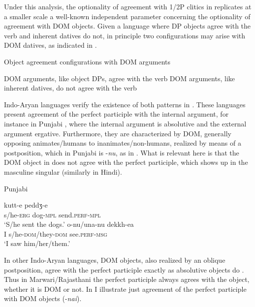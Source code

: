 \documentclass[output=paper]{langscibook}
\begin{document}
Under this analysis, the optionality of agreement with 1/2P clitics in  replicates at a smaller scale a well-known independent parameter concerning the optionality of agreement with DOM objects. Given a language where DP objects agree with the verb and inherent datives do not, in principle two configurations may arise with DOM datives, as indicated in .

\ea\label{ex:manzini:}
Object agreement configurations with DOM arguments \\
\begin{xlist}
\ex DOM arguments, like object DPs, agree with the verb
\ex DOM arguments, like inherent datives, do not agree with the verb
\end{xlist}
\z

Indo-Aryan languages verify the existence of both patterns in \emph{.} These languages present agreement of the perfect participle with the internal argument, for instance in Punjabi , where the internal argument is absolutive and the external argument ergative. Furthermore, they are characterized by DOM, generally opposing animates/humans to inanimates/non-humans, realized by means of a postposition, which in Punjabi is -\textit{nu}, as in . What is relevant here is that the DOM object in  does not agree with the perfect participle, which shows up in the masculine singular (similarly in Hindi).

\ea\label{ex:manzini:}
Punjabi \citep{ManziniEtAl2015}\\
\begin{xlist}
\ex {}     {kutt-e}     {peddʒ-e}\\
s/he-\textsc{erg}   dog-\textsc{mpl}   send.\textsc{perf-mpl}\\
\glt ‘S/he sent the dogs.’  
\ex {}   {o-nu/una-nu}       {dekkh-ea}\\
I   s/he\textsc{{}-dom}/they\textsc{{}-dom}    see.\textsc{perf-msg}\\
\glt ‘I saw him/her/them.’
\end{xlist} 
\z 

In other Indo-Aryan languages, DOM objects, also realized by an oblique postposition, agree with the perfect participle exactly as absolutive objects do \emph{\textup{\citep[342]{Masica1991}}}. Thus in Marwari/Rajasthani the perfect participle always agrees with the object, whether it is DOM or not. In  I illustrate just agreement of the perfect participle with DOM objects (-\textit{nai}).
\end{document}
